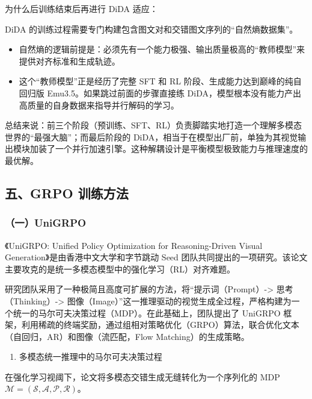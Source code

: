 为什么后训练结束后再进行 DiDA 适应：

DiDA 的训练过程需要专门构建包含图文对和交错图文序列的``自然熵数据集''。

\begin{itemize}
\tightlist
\item
  自然熵的逻辑前提是：必须先有一个能力极强、输出质量极高的``教师模型''来提供对齐标准和生成轨迹。
\item
  这个``教师模型''正是经历了完整 SFT 和 RL 阶段、生成能力达到巅峰的纯自回归版 Emu3.5。如果跳过前面的步骤直接练 DiDA，模型根本没有能力产出高质量的自身数据来指导并行解码的学习。
\end{itemize}

总结来说：前三个阶段（预训练、SFT、RL）负责脚踏实地打造一个理解多模态世界的``最强大脑''；而最后阶段的 DiDA，相当于在模型出厂前，单独为其视觉输出模块加装了一个并行加速引擎。这种解耦设计是平衡模型极致能力与推理速度的最优解。

\hypertarget{ux4e94grpo-ux8badux7ec3ux65b9ux6cd5}{%
\subsection{五、GRPO 训练方法}\label{ux4e94grpo-ux8badux7ec3ux65b9ux6cd5}}

\hypertarget{ux4e00unigrpo}{%
\subsubsection{（一）UniGRPO}\label{ux4e00unigrpo}}

《UniGRPO: Unified Policy Optimization for Reasoning-Driven Visual Generation》是由香港中文大学和字节跳动 Seed 团队共同提出的一项研究。该论文主要攻克的是统一多模态模型中的强化学习（RL）对齐难题。

研究团队采用了一种极简且高度可扩展的方法，将``提示词（Prompt）-\textgreater{} 思考（Thinking）-\textgreater{} 图像（Image）''这一推理驱动的视觉生成全过程，严格构建为一个统一的马尔可夫决策过程（MDP）。在此基础上，团队提出了 UniGRPO 框架，利用稀疏的终端奖励，通过组相对策略优化（GRPO）算法，联合优化文本（自回归，AR）和图像（流匹配，Flow Matching）的生成策略。

\begin{enumerate}
\def\labelenumi{\arabic{enumi}.}
\tightlist
\item
  多模态统一推理中的马尔可夫决策过程
\end{enumerate}

在强化学习视阈下，论文将多模态交错生成无缝转化为一个序列化的 MDP \(\mathcal{M}=(\mathcal{S},\mathcal{A},\mathcal{P},\mathcal{R})\)。

